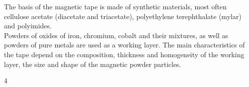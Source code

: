 \documentclass[a4paper,14pt]{extreport}
\begin{document}

  The basis of the magnetic tape is made of synthetic materials, most often cellulose acetate (diacetate and triacetate), polyethylene terephthalate (mylar) and polyimides. \\%

  Powders of oxides of iron, chromium, cobalt and their mixtures, as well as powders of pure metals are used as a working layer. The main characteristics of the tape depend on the composition, thickness and homogeneity of the working layer, the size and shape of the magnetic powder particles.

  \noindent{\color{blue} \rule{\linewidth}{0.7mm}}
  \begin{center}4\end{center}
  \noindent{\color{blue} \rule{\linewidth}{0.7mm}}

\end{document}
